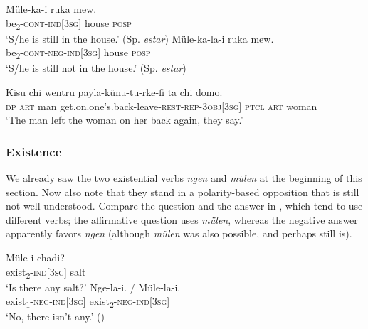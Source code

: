 \documentclass[output=paper,colorlinks,citecolor=brown,draft]{langscibook}
\begin{document}
\ea\label{ex:mapu:8}   
    \ea\label{ex:mapu:8a}
        \gll Müle-ka-i ruka mew. \\ 
             be\textsubscript{2}{}-\textsc{cont-ind[3sg]} house \textsc{posp} \\
        \glt ‘S/he is still in the house.’ (Sp. \textit{estar})
    \ex\label{ex:mapu:8b}
        \gll Müle-ka-la-i ruka mew. \\
             be\textsubscript{2}{}-\textsc{cont-neg-ind[3sg]} house \textsc{posp}\\
        \glt ‘S/he is still not in the house.’ (Sp. \textit{estar})
    \z
\z 

\ea\label{ex:mapu:9}
    \gll Kisu chi wentru payla-künu-tu-rke-fi ta chi domo. \\
         \textsc{dp} \textsc{art} man get.on.one’s.back-leave-\textsc{rest}{}-\textsc{rep-3obj[}3\textsc{sg]} \textsc{ptcl} \textsc{art} woman\\
    \glt ‘The man left the woman on her back again, they say.’ \citep[267]{Salas2006}
\z

\subsubsection{Existence} 
\label{sec:mapu:2.3.4}
We already saw the two existential verbs \textit{ngen} and \textit{mülen} at the beginning of this section. Now also note that they stand in a polarity-based opposition that is still not well understood. Compare the question and the answer in , which tend to use different verbs; the affirmative question uses \textit{mülen}, whereas the negative answer apparently favors \textit{ngen} (although \textit{mülen} was also possible, and perhaps still is). 

\ea\label{ex:mapu:10}
    \begin{xlist}
    \label{ex:mapu:10a}
        \gll Müle-i  chadi? \\ 
             exist\textsubscript{2}{}-\textsc{ind[3sg]} salt \\
        \glt ‘Is there any salt?’ \citep[55]{Augusta1916}
    \label{ex:mapu:10b}
        \gll Nge-la-i. / Müle-la-i. \\
             exist\textsubscript{1}{}-\textsc{neg-ind[3sg]} {} exist\textsubscript{2}{}-\textsc{neg{}-ind[3sg]}\\
        \glt ‘No, there isn’t any.’ (\citealt[55, 179]{Augusta1916})
    \end{xlist}
\z 
\end{document}
